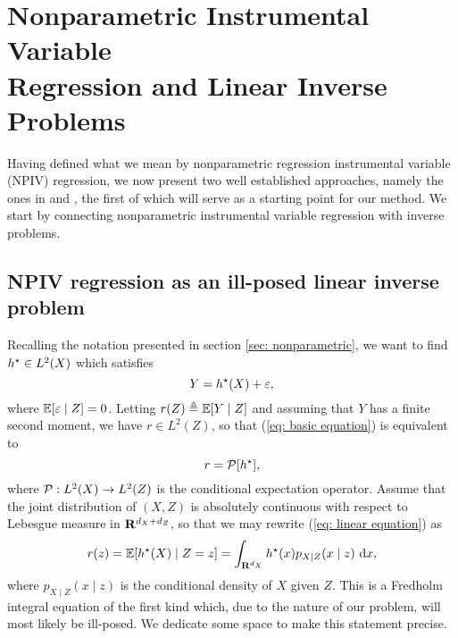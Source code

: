 \chapter{Nonparametric Instrumental Variable \\Regression and Linear Inverse Problems}

Having defined what we mean by nonparametric regression instrumental variable (NPIV) regression, we now present two well established approaches, namely the ones in \cite{darolles2011} and \cite{newey2003}, the first of which will serve as a starting point for our method.
We start by connecting nonparametric instrumental variable regression with inverse problems.

\section{NPIV regression as an ill-posed linear inverse problem}
\label{sec: npiv and ill posed lip}

Recalling the notation presented in section \ref{sec: nonparametric}, we want to find $ h^{ \star } \in L^{ 2 } ( X ) $ which satisfies
\begin{equation}
    \label{eq: basic equation}
    Y = h^{ \star } ( X ) + \varepsilon
,\end{equation}
where $ \mathbb{E} [ \varepsilon \mid Z ] = 0 $.
Letting $ r ( Z ) \triangleq \mathbb{E} [ Y \mid Z ] $ and assuming that $ Y $ has a finite second moment, we have $ r \in L^{ 2 } ( Z ) $, so that (\ref{eq: basic equation}) is equivalent to
\begin{equation}
    \label{eq: linear equation}
    r = \mathcal{P} [ h^{ \star } ]
,\end{equation}
where $ \mathcal{P} : L^{ 2 } ( X ) \to L^{ 2 } ( Z ) $ is the conditional expectation operator.
Assume that the joint distribution of $ ( X, Z ) $ is absolutely continuous with respect to Lebesgue measure in $ \mathbf{R}^{ d_{ X } + d_{ Z } } $, so that we may rewrite (\ref{eq: linear equation}) as
\begin{equation}
    \label{eq: expectation equation}
    r ( z ) = \mathbb{E} [ h^{ \star } ( X ) \mid Z = z ] = \int_{ \mathbf{R}^{ d_{ X } } } h^{ \star } ( x ) p_{ X \mid Z } ( x \mid z ) \ \mathrm{d} x
,\end{equation}
where $ p_{ X\mid Z } ( x \mid z ) $ is the conditional density of $ X $ given $ Z $.
This is a Fredholm integral equation of the first kind \cite{kress89} which, due to the nature of our problem, will most likely be ill-posed.
We dedicate some space to make this statement precise.

